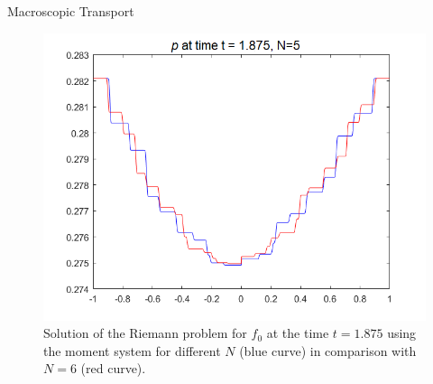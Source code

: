 \begin{frame}{Macroscopic Transport}
\begin{figure}[H]
\begin{minipage}{0.32\textwidth}
			\includegraphics[width=\textwidth]{Bilder_wx/Wavepropa/red=12th_blue=10th_wx=1_leftDr1_rightDr2_Awp12th}
		\end{minipage}
		\hfill
		\begin{minipage}{0.3\textwidth}
		\end{minipage}
		\caption{Solution of the Riemann problem for $f_0$ at the time $t = 1.875$ using the moment system for different $N$ (blue curve) in comparison with $N = 6$ (red curve).}
	\end{figure}
\end{frame}

